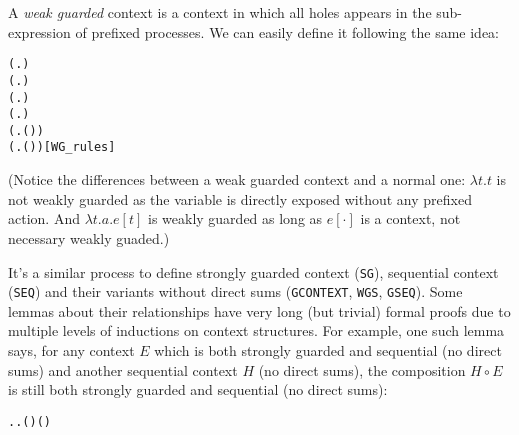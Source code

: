 A \emph{weak guarded} context is a context in which all holes appears
in the sub-expression of prefixed processes. We can easily define it
following the same idea:
\begin{alltt}
 (\HOLTokenLambda{}. )
  \HOLSymConst{\HOLTokenImp{}}  (\HOLTokenLambda{}.  )
  \HOLSymConst{\HOLTokenConj{}}   \HOLSymConst{\HOLTokenImp{}}  (\HOLTokenLambda{}.   \HOLSymConst{+}  )
  \HOLSymConst{\HOLTokenConj{}}   \HOLSymConst{\HOLTokenImp{}}  (\HOLTokenLambda{}.   \HOLSymConst{\ensuremath{\parallel}}  )
  \HOLSymConst{\HOLTokenImp{}}  (\HOLTokenLambda{}. \HOLSymConst{\ensuremath{\nu}}  ( ))
  \HOLSymConst{\HOLTokenImp{}}  (\HOLTokenLambda{}.  ( ) )\hfill{[WG_rules]}
\end{alltt}
(Notice the differences between a weak guarded context and a normal
one: $\lambda t. t$ is not weakly guarded as the variable is directly
exposed without any prefixed action. And $\lambda t. a.e[t]$ is weakly
guarded as long as $e[\cdot]$ is a context, not necessary weakly guaded.)

It's a similar process to define strongly guarded context
(\texttt{SG}), sequential context (\texttt{SEQ}) and their
variants without direct sums (\texttt{GCONTEXT}, \texttt{WGS},
\texttt{GSEQ}). Some lemmas about their relationships have very long
(but trivial) formal proofs due to multiple levels of
inductions on context structures. For example, one such 
lemma says, for any  context $E$ which is both strongly guarded
and sequential (no direct sums) and another sequential context $H$ (no
direct sums), the composition $H \circ E$ is still both strongly
guarded and sequential (no direct sums):
\begin{alltt}
\HOLTokenTurnstile{} \HOLSymConst{\HOLTokenForall{}}.   \HOLSymConst{\HOLTokenConj{}}   \HOLSymConst{\HOLTokenImp{}} \HOLSymConst{\HOLTokenForall{}}.   \HOLSymConst{\HOLTokenImp{}}  ( \HOLSymConst{\HOLTokenCompose} ) \HOLSymConst{\HOLTokenConj{}}  ( \HOLSymConst{\HOLTokenCompose} )
\end{alltt}

